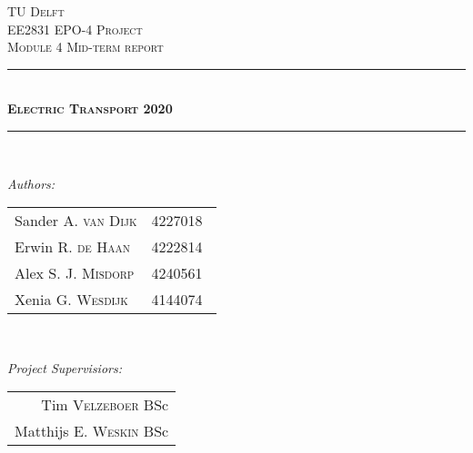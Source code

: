 \documentclass[12pt]{scrreprt}
\begin{document}
\begin{titlepage}

\newcommand{\HRule}{\rule{\linewidth}{0.5mm}} %

\center %
 

\textsc{\LARGE TU Delft}\\[1.5cm] %
\textsc{\Large EE2831 EPO-4 Project}\\[0.5cm] %
\textsc{\large Module 4 Mid-term report}\\[0.5cm] %


\HRule \\[0.4cm]
\textsc{\huge \bfseries Electric Transport 2020}\\[0.2cm] %
\HRule \\[1.5cm]
 

\begin{minipage}{0.45\textwidth}
\begin{flushleft} \large
\emph{Authors:}\\
\begin{tabular}{ll}
Sander A. \textsc{van Dijk} & 4227018\\
Erwin R. \textsc{de Haan} & 4222814\\
Alex S. J. \textsc{Misdorp} & 4240561\\
Xenia G. \textsc{Wesdijk} & 4144074\

\end{tabular}

\end{flushleft}
\end{minipage}
~
\begin{minipage}{0.45\textwidth}
\begin{flushright} \large
\emph{Project Supervisiors:} \\
\begin{tabular}{r}
Tim \textsc{Velzeboer} BSc\\
Matthijs E. \textsc{Weskin} BSc\\
\end{tabular}
\end{flushright}
\end{minipage}\\[1.5cm]


\end{titlepage}
\end{document}
